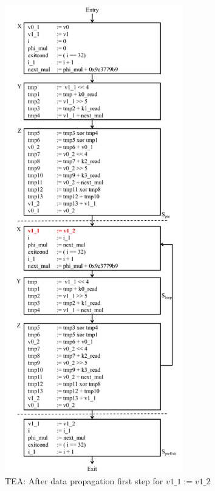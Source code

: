 \begin{figure}[H]
\begin{center}
\includegraphics[height=8in]{fig-proposal/tea-after-data-propagation3}
\caption{TEA: After data propagation first step for $v1\_1 := v1\_2$}
\label{fig:tea-after-data-propagation3}
\end{center}
\end{figure}

